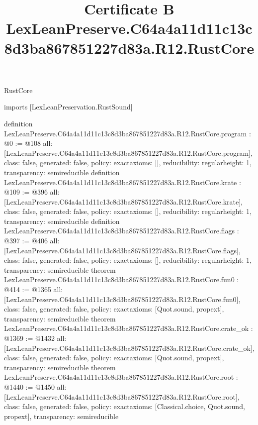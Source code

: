 \begin{lexlean}{RustCore}
\title{Certificate B LexLeanPreserve.C64a4a11d11c13c8d3ba867851227d83a.R12.RustCore}
\begin{coremodule}
imports [LexLeanPreservation.RustSound]

definition LexLeanPreserve.C64a4a11d11c13c8d3ba867851227d83a.R12.RustCore.program : @0 := @108 {
  all: [LexLeanPreserve.C64a4a11d11c13c8d3ba867851227d83a.R12.RustCore.program],
  class: false,
  generated: false,
  policy: exact{axioms: []},
  reducibility: regular{height: 1},
  transparency: semireducible
}
definition LexLeanPreserve.C64a4a11d11c13c8d3ba867851227d83a.R12.RustCore.krate : @109 := @396 {
  all: [LexLeanPreserve.C64a4a11d11c13c8d3ba867851227d83a.R12.RustCore.krate],
  class: false,
  generated: false,
  policy: exact{axioms: []},
  reducibility: regular{height: 1},
  transparency: semireducible
}
definition LexLeanPreserve.C64a4a11d11c13c8d3ba867851227d83a.R12.RustCore.flags : @397 := @406 {
  all: [LexLeanPreserve.C64a4a11d11c13c8d3ba867851227d83a.R12.RustCore.flags],
  class: false,
  generated: false,
  policy: exact{axioms: []},
  reducibility: regular{height: 1},
  transparency: semireducible
}
theorem LexLeanPreserve.C64a4a11d11c13c8d3ba867851227d83a.R12.RustCore.fun0 : @414 := @1365 {
  all: [LexLeanPreserve.C64a4a11d11c13c8d3ba867851227d83a.R12.RustCore.fun0],
  class: false,
  generated: false,
  policy: exact{axioms: [Quot.sound, propext]},
  transparency: semireducible
}
theorem LexLeanPreserve.C64a4a11d11c13c8d3ba867851227d83a.R12.RustCore.crate_ok : @1369 := @1432 {
  all: [LexLeanPreserve.C64a4a11d11c13c8d3ba867851227d83a.R12.RustCore.crate_ok],
  class: false,
  generated: false,
  policy: exact{axioms: [Quot.sound, propext]},
  transparency: semireducible
}
theorem LexLeanPreserve.C64a4a11d11c13c8d3ba867851227d83a.R12.RustCore.root : @1440 := @1450 {
  all: [LexLeanPreserve.C64a4a11d11c13c8d3ba867851227d83a.R12.RustCore.root],
  class: false,
  generated: false,
  policy: exact{axioms: [Classical.choice, Quot.sound, propext]},
  transparency: semireducible
}


\end{coremodule}
\end{lexlean}
